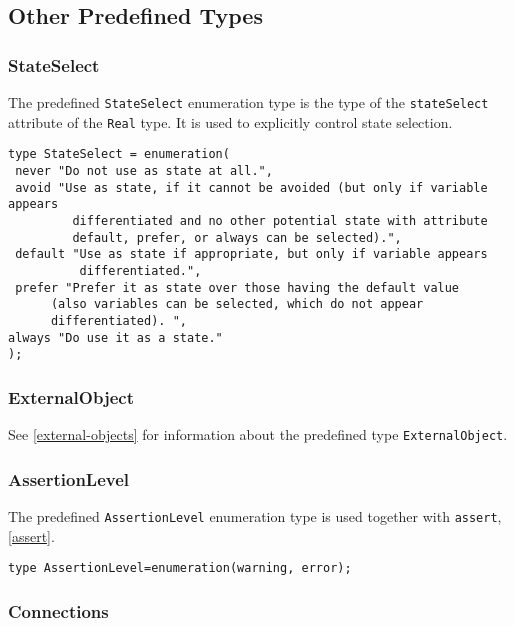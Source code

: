 \subsection{Other Predefined Types}

\subsubsection{StateSelect}

The predefined \lstinline!StateSelect! enumeration type is the type of the
\lstinline!stateSelect! attribute of the \lstinline!Real! type. It is used to explicitly control
state selection.

\begin{lstlisting}[language=modelica]
type StateSelect = enumeration(
 never "Do not use as state at all.",
 avoid "Use as state, if it cannot be avoided (but only if variable appears
         differentiated and no other potential state with attribute
         default, prefer, or always can be selected).",
 default "Use as state if appropriate, but only if variable appears
          differentiated.",
 prefer "Prefer it as state over those having the default value
      (also variables can be selected, which do not appear
      differentiated). ",
always "Do use it as a state."
);
\end{lstlisting}

\subsubsection{ExternalObject}

See \autoref{external-objects} for information about the predefined type
\lstinline!ExternalObject!.

\subsubsection{AssertionLevel}

The predefined \lstinline!AssertionLevel! enumeration type is used together with
\lstinline!assert!, \autoref{assert}.
\begin{lstlisting}[language=modelica]
type AssertionLevel=enumeration(warning, error);
\end{lstlisting}

\subsubsection{Connections}

